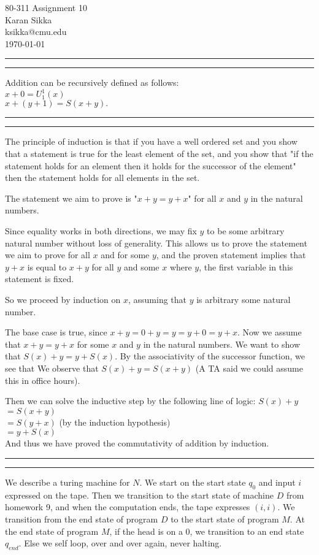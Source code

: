 \documentclass[11pt,letterpaper]{article}
\makeatletter
\newcommand{\question}[1] {\vspace{.25in} \hrule\vspace{0.5em}
\noindent{\bf #1} \vspace{0.5em}
\hrule \vspace{.10in}}
\newcommand{\myname}{Karan Sikka}
\newcommand{\myandrew}{ksikka@cmu.edu}
\newcommand{\myhwnum}{10}
\makeatother
\begin{document}
\medskip

\thispagestyle{plain}
\begin{center}                  %
{\Large 80-311 Assignment \myhwnum} \\
\myname \\
\myandrew \\
\today
\end{center}

\question{1.1}
Addition can be recursively defined as follows:\\
$x + 0 = U_1^1(x)$\\
$x + (y + 1) = S(x + y).$\\

\question{1.2}
The principle of induction is that if you have a well ordered set and you show that a statement is true for the least element of the set, and you show that "if the statement holds for an element then it holds for the successor of the element" then the statement holds for all elements in the set.

The statement we aim to prove is "$x + y = y + x$" for all $x$ and $y$ in the natural numbers.

Since equality works in both directions, we may fix $y$ to be some arbitrary natural number without loss of generality.
This allows us to prove the statement we aim to prove for all $x$ and for some $y$, and the proven statement implies that $y + x$ is equal to $x + y$ for all $y$ and some $x$ where $y$, the first variable in this statement is fixed.

So we proceed by induction on $x$, assuming that $y$ is arbitrary some natural number.

The base case is true, since $x + y = 0 + y = y = y + 0 = y + x$.
Now we assume that $x + y = y + x$ for some $x$ and $y$ in the natural numbers.
We want to show that $S(x) + y = y + S(x)$. By the associativity of the successor function, we see that
We observe that $S(x) + y = S(x + y)$ (A TA said we could assume this in office hours).

Then we can solve the inductive step by the following line of logic:
$S(x) + y$\\
$= S(x + y)$\\
$= S(y + x)$ (by the induction hypothesis)\\
$= y + S(x)$\\

And thus we have proved the commutativity of addition by induction.

\question{2}
We describe a turing machine for $N$.
We start on the start state $q_0$ and input $i$ expressed on the tape.
Then we transition to the start state of machine $D$ from homework 9, and when the
computation ends, the tape expresses $(i,i)$. We transition from the end state
of program $D$ to the start state of program $M$. At the end state of program $M$, if the head is on a $0$,
we transition to an end state $q_{end}$. Else we self loop, over and over again, never halting.
\end{document}
